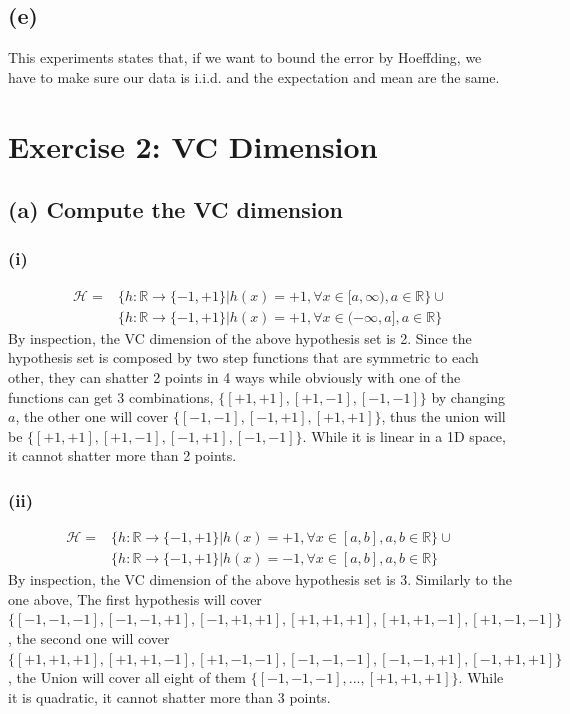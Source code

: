 \documentclass[11pt]{article}
\begin{document}
\subsection*{(e)}
This experiments states that, if we want to bound the error by Hoeffding, we have to make sure our data is i.i.d. and the expectation and mean are the same. 
\pagebreak
\section*{Exercise 2: VC Dimension}
\subsection*{(a) Compute the VC dimension}
\subsubsection*{(i)}	
\begin{equation}
\begin{split}
\mathcal{H}=&\{h:\mathbb{R}\rightarrow\{-1,+1\}|h(x)=+1,\forall x\in[a,\infty), a\in\mathbb{R}\} \cup \\
&\{h:\mathbb{R}\rightarrow\{-1,+1\}|h(x)=+1,\forall x\in(-\infty,a], a\in\mathbb{R}\}
\end{split}
\end{equation}
By inspection, the VC dimension of the above hypothesis set is 2. Since the hypothesis set is composed by two step functions that are symmetric to each other, they can shatter 2 points in 4 ways while obviously with one of the functions can get 3 combinations, $\{[+1,+1],[+1,-1],[-1,-1]\}$ by changing $a$, the other one will cover $\{[-1,-1],[-1,+1],[+1,+1]\}$, thus the union will be $\{[+1,+1],[+1,-1],[-1,+1],[-1,-1]\}$. While it is linear in a 1D space, it cannot shatter more than 2 points.

\subsubsection*{(ii)}
\begin{equation}
\begin{split}
\mathcal{H}=&\{h:\mathbb{R}\rightarrow\{-1,+1\}|h(x)=+1,\forall x\in[a,b], a,b\in\mathbb{R}\} \cup \\
&\{h:\mathbb{R}\rightarrow\{-1,+1\}|h(x)=-1,\forall x\in[a,b], a,b\in\mathbb{R}\}
\end{split}
\end{equation}
By inspection, the VC dimension of the above hypothesis set is 3. Similarly to the one above, The first hypothesis will cover $\{[-1,-1,-1],[-1,-1,+1],[-1,+1,+1],[+1,+1,+1],[+1,+1,-1],[+1,-1,-1]\}$, the second one will cover $\{[+1,+1,+1],[+1,+1,-1],[+1,-1,-1],[-1,-1,-1],[-1,-1,+1],[-1,+1,+1]\}$, the Union will cover all eight of them $\{[-1,-1,-1], ... ,[+1,+1,+1]\}$. While it is quadratic, it cannot shatter more than 3 points. 
\end{document}
